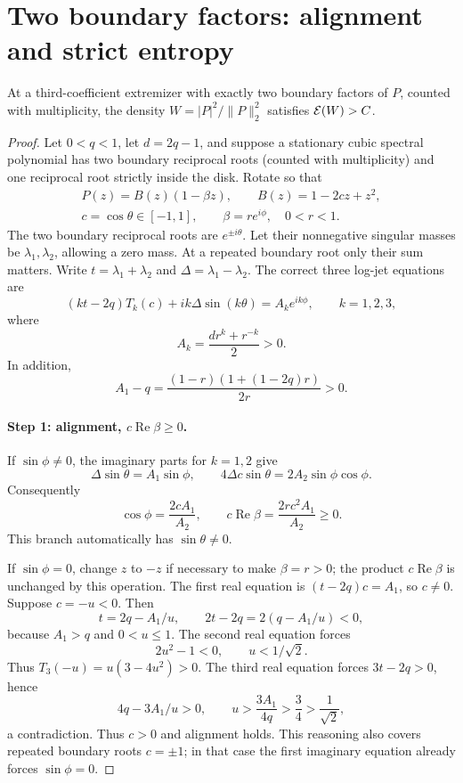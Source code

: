 \section{Two boundary factors: alignment and strict entropy}
\begin{lemma}\label{lem:two}
At a third-coefficient extremizer with exactly two boundary factors of
$P$, counted with multiplicity, the density $W=|P|^2/\|P\|_2^2$
satisfies $\mathcal E(W)>C$.
\end{lemma}
\begin{proof}
Let $0<q<1$, let $d=2q-1$, and suppose a stationary cubic spectral polynomial has two boundary reciprocal roots (counted with multiplicity) and one reciprocal root strictly inside the disk. Rotate so that
\[
 \begin{gathered}
 P(z)=B(z)(1-\beta z),\qquad B(z)=1-2cz+z^2,\\
 c=\cos\theta\in[-1,1],\qquad\beta=re^{i\phi},\quad 0<r<1.
 \end{gathered}
\]
The two boundary reciprocal roots are $e^{\pm i\theta}$. Let their nonnegative singular masses be $\lambda_1,\lambda_2$, allowing a zero mass. At a repeated boundary root only their sum matters. Write $t=\lambda_1+\lambda_2$ and $\Delta=\lambda_1-\lambda_2$.
The correct three log-jet equations are
\[
 (kt-2q)T_k(c)+ik\Delta\sin(k\theta)=A_k e^{ik\phi},\qquad k=1,2,3,
\]
where
\[
 A_k=\frac{d r^k+r^{-k}}2>0.
\]
In addition,
\[
 A_1-q=\frac{(1-r)(1+(1-2q)r)}{2r}>0.
\]

\paragraph{Step 1: alignment, $c\operatorname{Re}\beta\ge0$.}
If $\sin\phi\ne0$, the imaginary parts for $k=1,2$ give
\[
 \Delta\sin\theta=A_1\sin\phi,
 \qquad 4\Delta c\sin\theta=2A_2\sin\phi\cos\phi.
\]
Consequently
\[
 \cos\phi=\frac{2cA_1}{A_2},\qquad
 c\operatorname{Re}\beta=\frac{2r c^2 A_1}{A_2}\ge0.
\]
This branch automatically has $\sin\theta\ne0$.

If $\sin\phi=0$, change $z$ to $-z$ if necessary to make $\beta=r>0$; the product $c\operatorname{Re}\beta$ is unchanged by this operation. The first real equation is $(t-2q)c=A_1$, so $c\ne0$. Suppose $c=-u<0$. Then
\[
 t=2q-A_1/u,\qquad
 2t-2q=2(q-A_1/u)<0,
\]
because $A_1>q$ and $0<u\le1$. The second real equation forces
\[
 2u^2-1<0,\qquad u<1/\sqrt2.
\]
Thus $T_3(-u)=u(3-4u^2)>0$. The third real equation forces $3t-2q>0$, hence
\[
 4q-3A_1/u>0,\qquad
 u>\frac{3A_1}{4q}>\frac34>\frac1{\sqrt2},
\]
a contradiction. Thus $c>0$ and alignment holds. This reasoning also covers repeated boundary roots $c=\pm1$; in that case the first imaginary equation already forces $\sin\phi=0$.


\end{proof}
